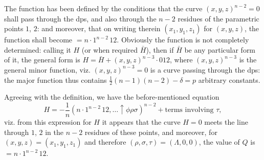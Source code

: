\documentclass[11pt,a4paper]{book}
\begin{document}
\begin{art}\label{art:42}
The function has been defined by the conditions that the curve $(x, y, z)^{n-2} = 0$ shall pass through the dps, and also through the $n-2$ residues of the parametric points $1$, $2$: and moreover, that on writing therein $(x_1, y_1, z_1)$ for $(x, y, z)$, the function shall become $= n \cdot 1^{n-2}\,12$. Obviously the function is not completely determined: calling it $H$ (or when required $\bar{H}$), then if $\bar{H}$ be any particular form of it, the general form is $H = \bar{H} + (x, y, z)^{n-3} \cdot 012$, where $(x, y, z)^{n-3}$ is the general minor function, viz. $(x, y, z)^{n-3} = 0$ is a curve passing through the dps: the major function thus contains $\frac{1}{2}(n-1)(n-2) - \delta = p$ arbitrary constants.

Agreeing with the definition, we have the before-mentioned equation
\[
H = -\frac{1}{n}(n \cdot 1^{n-2}\,12, \ldots \uparrow\phi\rho\sigma)^{n-2} + \text{terms involving } \tau,
\]
viz. from this expression for $H$ it appears that the curve $H = 0$ meets the line through $1$, $2$ in the $n-2$ residues of these points, and moreover, for $(x, y, z) = (x_1, y_1, z_1)$ and therefore $(\rho, \sigma, \tau) = (\Lambda, 0, 0)$, the value of $Q$ is $= n \cdot 1^{n-2}\,12$.
\end{art}
\end{document}
